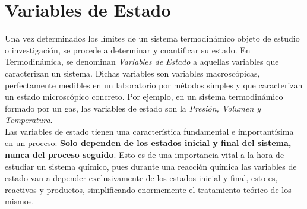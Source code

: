 \section{Variables de Estado}

Una vez determinados los límites de un sistema termodinámico objeto de estudio o investigación, se procede a determinar y cuantificar su estado. En Termodinámica, se denominan \emph{Variables de Estado} a aquellas variables que caracterizan un sistema. Dichas variables son variables macroscópicas, perfectamente medibles en un laboratorio por métodos simples y que caracterizan un estado microscópico concreto. Por ejemplo, en un sistema termodinámico formado por un gas, las variables de estado son la \emph{Presión, Volumen y Temperatura}.\\

Las variables de estado tienen una característica fundamental e importantísima en un proceso: \textbf{Solo dependen de los estados inicial y final del sistema, nunca del proceso seguido}. Esto es de una importancia vital a la hora de estudiar un sistema químico, pues durante una reacción química las variables de estado van a depender exclusivamente de los estados inicial y final, esto es, reactivos y productos, simplificando enormemente el tratamiento teórico de los mismos.

